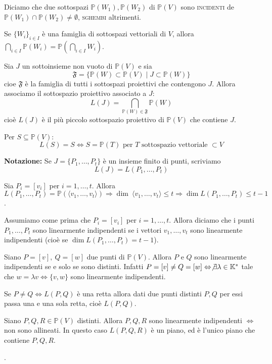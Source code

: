 \begin{defn}
  Diciamo che due sottospazi $\mathbb{P}(W_1), \mathbb{P}(W_2)$ di $\mathbb{P}(V)$ sono \textsc{incidenti} de $\mathbb{P}(W_1) \cap \mathbb{P}(W_2) \not=\emptyset$, \textsc{sghembi} altrimenti.
\end{defn}

\begin{oss}
  \begin{nlist}
    \item Se $\{W_i\}_{i \in I}$ è una famiglia di sottospazi vettoriali di $V$, allora $\displaystyle \bigcap_{i \in I} \mathbb{P}(W_i)=\mathbb{P}\left(\bigcap_{i \in I}W_i\right)$.
    \item Sia $J$ un sottoinsieme non vuoto di $\mathbb{P}(V)$ e sia
    $$\mathfrak{F}=\{\mathbb{P}(W) \subset \mathbb{P}(V) \mid J \subset \mathbb{P}(W)\}$$
    cioe $\mathfrak{F}$ è la famiglia di tutti i sottospazi proiettivi che contengono $J$. Allora associamo il sottospazio proiettivo 				associato a $J$:
    $$L(J)=\bigcap _{\mathbb{P}(W) 	\in \mathfrak{F}} \mathbb{P}(W)$$
    cioè $L(J)$ è il più piccolo sottospazio proiettivo di $\mathbb{P}(V)$ che contiene $J$.
    \item Per $S \subseteq \mathbb{P}(V)$:
    $$L(S)=S \Leftrightarrow S=\mathbb{P}(T) \text{ per }T\text{ sottospazio vettoriale }\subset V$$
    \item \textbf{Notazione:} Se $J=\{P_1,\dots,P_t\}$ è un insieme finito di punti, scriviamo
    $$L(J)=L(P_1,\dots,P_t)$$
    \item Sia $P_i=[v_i]$ per $i=1,\dots,t$. Allora $L(P_1,\dots,P_t)=\mathbb{P}(\langle v_1,\dots,v_t \rangle) \Rightarrow \dim \				\langle v_1,\dots,v_t \rangle \le t \Rightarrow \dim L(P_1,\dots,P_t) \le t-1$.
  \end{nlist}
\end{oss}

\begin{defn}
Assumiamo come prima che $P_i=[v_i]$ per $i=1,\dots,t$. Allora diciamo che i punti $P_1,\dots,P_t$ sono linearmente indipendenti se i vettori $v_1,\dots,v_t$ sono linearmente indipendenti (cioè se $\dim L(P_1,\dots,P_t)=t-1$).
\end{defn}

\begin{oss}
  \begin{nlist}
	\item Siano $P=[v],\ Q=[w]$ due punti di $\mathbb{P}(V)$. Allora $P$ e $Q$ sono linearmente indipendenti se e solo se sono 				distinti. Infatti $P=[v]\neq Q=[w] \Leftrightarrow \not\exists \lambda \in \mathbb{K}^*$ tale che $w=\lambda v \Leftrightarrow \{v,w\}$ sono linearmente indipendenti.
	\item Se $P \neq Q \Leftrightarrow L(P,Q)$ è una retta allora dati due punti distinti $P,Q$ per essi passa una e una sola retta, cioè 		$L(P,Q)$.
	\item Siano $P,Q,R \in \mathbb{P}(V)$ distinti. Allora $P,Q,R$ sono linearmente indipendenti $\Leftrightarrow$ non sono allineati. 	In questo caso $L(P,Q,R)$ è un piano, ed è l'unico piano che contiene $P,Q,R$.
  \end{nlist}.
\end{oss}

